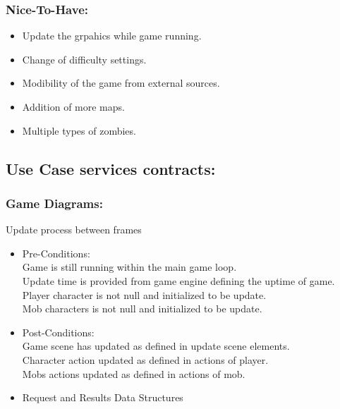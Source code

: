 \documentclass[letterpaper]{article}
\begin{document}
				\vspace{0.2in}
				\subsubsection*{Nice-To-Have:}
				\vspace{0.2in}
					\begin{itemize}
						\item Update the grpahics while game running.
						\item Change of difficulty settings.
						\item Modibility of the game from external sources.
						\item Addition of more maps.
						\item Multiple types of zombies.
					\end{itemize}
					
			\vspace{0.2in}
			\subsection*{Use Case services contracts:}
			\vspace{0.1in}
				
				\subsubsection*{Game Diagrams:}
				\vspace{0.1in}
					
					\hspace{5mm}Update process between frames
					\begin{itemize}
						\item Pre-Conditions: \\
							Game is still running within the main game loop. \\
							Update time is provided from game engine defining the uptime of game. \\
							Player character is not null and initialized to be update. \\
							Mob characters is not null and initialized to be update.
						\item Post-Conditions: \\
							Game scene has updated as defined in update scene elements. \\
							Character action updated as defined in actions of player. \\
							Mobs actions updated as defined in actions of mob.
						\item Request and Results Data Structures \\
							
					\end{itemize}
					
\end{document}

